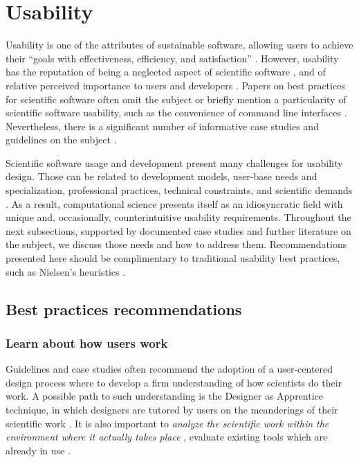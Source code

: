\section{Usability}
\label{sec:usability}

Usability is one of the attributes of sustainable software, allowing users to achieve their “goals with effectiveness, efficiency, and satisfaction” \cite[p.3]{Venters_WSSSPE}. However, usability has the reputation of being a neglected aspect of scientific software \cite{Ahmed:2014}, and of relative perceived importance to users and developers \cite{Nguyen-Hoan:2010, Hucka:2016}. Papers on best practices for scientific software often omit the subject \cite{Stodden_WSSSPE, Wilson:2016} or briefly mention a particularity of scientific software usability, such as the convenience of command line interfaces \cite{bestprSC}. Nevertheless, there is a significant number of informative case studies and guidelines on the subject \cite{MacLeod:1992, Springmeyer:1993, Pancake:1996, Javahery:2004, Schraefel:2004,Letondal:2004, Talbott:2005, Macaulay:2009, DeRoure:2009, Keefe:2010, DeMatos:2013, Ahmed:2014, Beg:2016, List:2017}.

Scientific software usage and development present many challenges for usability design. Those can be related to development models, user-base needs and specialization, professional practices, technical constraints, and scientific demands \cite{Queiroz:2016}. As a result, computational science presents itself as an idiosyncratic field with unique and, occasionally, counterintuitive usability requirements. Throughout the next subsections, supported by documented case studies and further literature on the subject, we discuss those needs and how to address them. Recommendations presented here should be complimentary to traditional usability best practices, such as Nielsen's heuristics \cite{Nielsen:1994}.

\subsection{Best practices recommendations}

\subsubsection{Learn about how users work}

Guidelines and case studies often recommend the adoption of a user-centered design process where to develop a firm understanding of how scientists do their work.  A possible path to such understanding is the Designer as Apprentice technique, in which designers are tutored by users on the meanderings of their scientific work \cite{Springmeyer:1993}.  It is also important to \emph{analyze the scientific work within the environment where it actually takes place} \cite{Pancake:1996}, evaluate existing tools which are already in use \cite{Javahery:2004}.  

